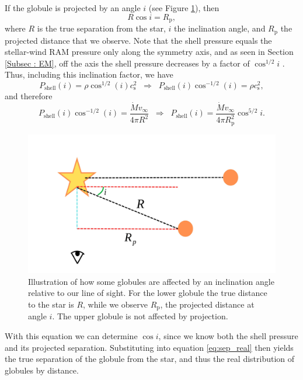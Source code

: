 \documentclass{book}
\begin{document}
If the globule is projected by an angle $i$ (see Figure
\ref{Ang proyeccion}), then
\begin{equation}
R\cos i=R_\mathrm{p},
\end{equation}\label{eq:sep_real}
where $R$ is the true separation from the star, $i$ the inclination
angle, and $R_\mathrm{p}$ the projected distance that we observe. Note
that the shell pressure equals the stellar-wind RAM pressure only
along the symmetry axis, and as seen in Section \ref{Subsec : EM}, off
the axis the shell pressure decreases by a factor of $\cos^{1/2}i$
\citep{Tarango:2018}. Thus, including this inclination factor, we have
\begin{equation}
    P_\mathrm{shell}(i)=\rho\cos^{1/2}(i) c_\mathrm{s}^2 \;\;\Rightarrow\;\;
    P_\mathrm{shell}(i)\cos^{-1/2}(i)=\rho c_\mathrm{s}^2,
\end{equation}
and therefore
\begin{equation}
P_\mathrm{shell}(i)\cos^{-1/2}(i)=\frac{\dot{M}v_\infty}{4\pi R^2}
\;\;\Rightarrow\;\;
P_\mathrm{shell}(i)=\frac{\dot{M}v_\infty}{4\pi R_\mathrm{p}^2}\cos^{5/2}i.
\end{equation}\label{eq:cos 5_2}

\begin{figure}[htb]
    \centering
    \includegraphics[width=\textwidth]{artesanales/ImgFi01-6.pdf}
    \caption{Illustration of how some globules are affected by an
      inclination angle relative to our line of sight. For the lower
      globule the true distance to the star is $R$, while we observe
      $R_\mathrm{p}$, the projected distance at angle $i$. The upper
      globule is not affected by projection.}
    \label{Ang proyeccion}
\end{figure}

With this equation we can determine $\cos i$, since we know both the
shell pressure and its projected separation. Substituting into
equation \ref{eq:sep_real} then yields the true separation of the
globule from the star, and thus the real distribution of globules by
distance.
\end{document}

